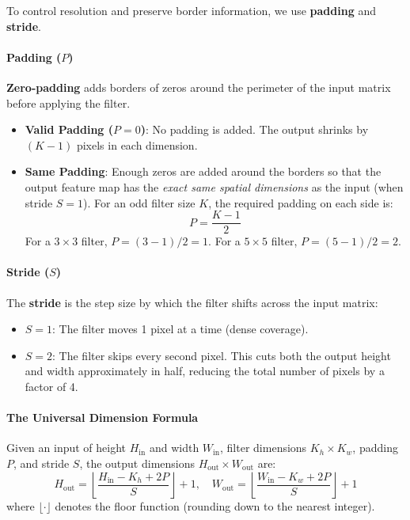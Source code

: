 To control resolution and preserve border information, we use \textbf{padding} and \textbf{stride}.

\paragraph{Padding ($P$)}
\textbf{Zero-padding} adds borders of zeros around the perimeter of the input matrix before applying the filter.
\begin{itemize}
    \item \textbf{Valid Padding ($P = 0$)}: No padding is added. The output shrinks by $(K - 1)$ pixels in each dimension.
    \item \textbf{Same Padding}: Enough zeros are added around the borders so that the output feature map has the \emph{exact same spatial dimensions} as the input (when stride $S=1$). For an odd filter size $K$, the required padding on each side is:
    \begin{equation}
    P = \frac{K - 1}{2}\label{eq:same_padding}
    \end{equation}
    For a $3 \times 3$ filter, $P = (3-1)/2 = 1$. For a $5 \times 5$ filter, $P = (5-1)/2 = 2$.
\end{itemize}

\paragraph{Stride ($S$)}
The \textbf{stride} is the step size by which the filter shifts across the input matrix:
\begin{itemize}
    \item $S = 1$: The filter moves 1 pixel at a time (dense coverage).
    \item $S = 2$: The filter skips every second pixel. This cuts both the output height and width approximately in half, reducing the total number of pixels by a factor of 4.
\end{itemize}

\paragraph{The Universal Dimension Formula}
Given an input of height $H_{\text{in}}$ and width $W_{\text{in}}$, filter dimensions $K_h \times K_w$, padding $P$, and stride $S$, the output dimensions $H_{\text{out}} \times W_{\text{out}}$ are:
\begin{equation}
H_{\text{out}} = \left\lfloor \frac{H_{\text{in}} - K_h + 2P}{S} \right\rfloor + 1, \quad
W_{\text{out}} = \left\lfloor \frac{W_{\text{in}} - K_w + 2P}{S} \right\rfloor + 1\label{eq:dim_formula}
\end{equation}
where $\lfloor \cdot \rfloor$ denotes the floor function (rounding down to the nearest integer).

